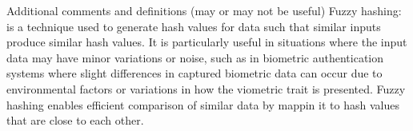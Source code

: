 Additional comments and definitions (may or may not be useful)
Fuzzy hashing: is a technique used to generate hash values for data such that similar inputs produce similar hash values. It is particularly useful in situations where the input data may have minor variations or noise, such as in biometric authentication systems where slight differences in captured biometric data can occur due to environmental factors or variations in how the viometric trait is presented. Fuzzy hashing enables efficient comparison of similar data by mappin it to hash values that are close to each other.


